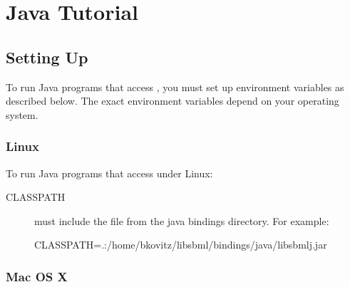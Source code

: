 \documentclass{sbmlmanual}
\begin{document}


\section{Java Tutorial}
\label{sec:java}

\subsection{Setting Up}
\label{sec:java-setting-up}

To run Java programs that access \libsbml{}, you must set up
environment variables as described below.  The exact environment variables
depend on your operating system.

\subsubsection{Linux}
\label{sec:java-linux-setup}

To run Java programs that access \libsbml{} under Linux:

\begin{description}

\item[CLASSPATH]
must include the  file from the \libsbml{}
java bindings directory.  For example:

\begin{shellVerbatim}
CLASSPATH=.:/home/bkovitz/libsbml/bindings/java/libsbmlj.jar
\end{shellVerbatim}

\end{description}

\subsubsection{Mac OS X}
\label{sec:java-osx-setup}
\end{document}

